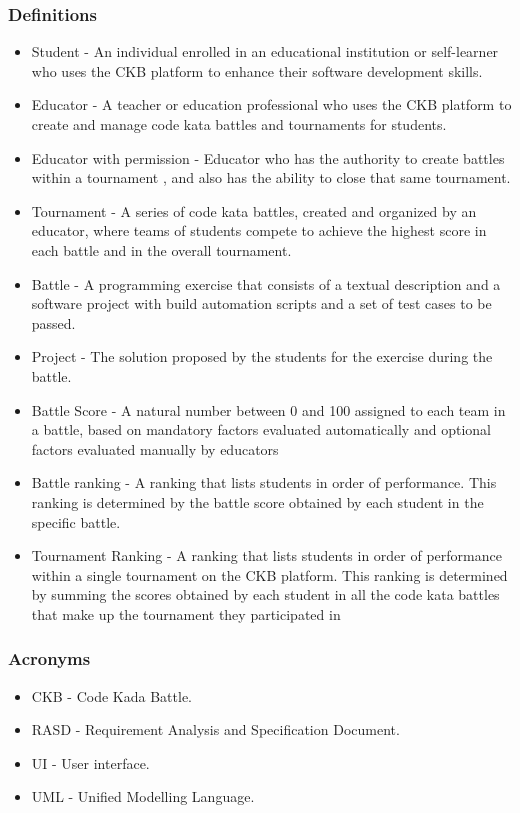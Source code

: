 \subsubsection{Definitions}
\begin{itemize}
\item Student - An individual enrolled in an educational institution or self-learner who uses the CKB platform to enhance their software development skills.
    \item Educator - A teacher or education professional who uses the CKB platform to create and manage code kata battles and tournaments for students.
    \item Educator with permission - Educator who has the authority to create battles within a tournament , and also has the ability to close that same tournament. 
    \item Tournament - A series of code kata battles, created and organized by an educator, where teams of students compete to achieve the highest score in each battle and in the overall tournament.
    
    \item Battle - A programming exercise that consists of a textual description and a software project with build automation scripts and a set of test cases to be passed.

    \item Project - The solution proposed by the students for the exercise during the battle.
    
    \item  Battle Score - A natural number between 0 and 100 assigned to each team in a battle, based on mandatory factors evaluated automatically and optional factors evaluated manually by educators
    \item Battle ranking - A ranking that lists students in order of performance. This ranking is determined by the battle score obtained by each student in the specific battle.
    \item Tournament Ranking - A ranking that lists students in order of performance within a single tournament on the CKB platform. This ranking is determined by summing the scores obtained by each student in all the code kata battles that make up the tournament they participated in
    \end{itemize}
    
\subsubsection{Acronyms}
\begin{itemize}
    \item CKB - Code Kada Battle.
    \item RASD - Requirement Analysis and Specification Document. 
    \item UI - User interface. 
    \item UML - Unified Modelling Language.
\end{itemize}
